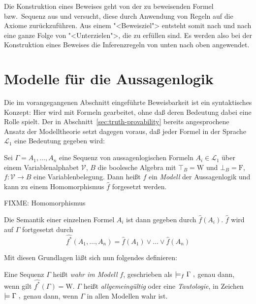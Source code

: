 Die Konstruktion eines Beweises geht
von der zu beweisenden Formel bzw.\ Sequenz aus und
versucht, diese durch Anwendung von Regeln auf die Axiome zurückzuführen.  Aus
einem "<Beweisziel"> entsteht somit nach und nach eine ganze Folge von
"<Unterzielen">, die zu erfüllen sind.  Es werden also bei der Konstruktion eines
Beweises die Inferenzregeln von unten nach
oben angewendet.

\section{Modelle für die Aussagenlogik}
\label{sec:models}

Die im vorangegangenen Abschnitt eingeführte Beweisbarkeit ist ein
syntaktisches Konzept: Hier wird mit Formeln gearbeitet, ohne daß deren
Bedeutung dabei eine Rolle spielt.  Der in
Abschnitt~\ref{sec:truth-provability} bereits angesprochene Ansatz der
Modelltheorie setzt dagegen voraus, daß jeder
Formel in der Sprache $\mathcal{L}_1$ eine Bedeutung gegeben wird:  

\begin{definition}
  Sei $\Gamma=A_1,\ldots,A_n$ eine Sequenz von aussagenlogischen Formeln $A_i\in
  \mathcal{L}_1$ über einem Variablenalphabet
  $\mathcal{V}$, $B$ die boolesche Algebra mit $\top_B=\mathrm{W}$ und $\bot_B=\mathrm{F}$, $f:\mathcal{V}\rightarrow 
  B$ eine Variablenbelegung.  Dann heißt $f$ ein \emph{Modell} der
  Aussagenlogik und kann zu einem
  Homomorphismus $\hat{f}$ forgesetzt werden.

  FIXME: Homomorphismus

  Die Semantik einer einzelnen Formel $A_i$ ist dann gegeben
  durch $\hat{f}(A_i)$.  $\hat{f}$ wird auf $\Gamma$
  fortgesetzt durch
  \[ \widehat{\mbox{$f$}^*}(A_1,\dots,A_n) = \hat{f}(A_1)\vee\dots\vee\hat{f}(A_n)\]
\end{definition}

Mit diesen Grundlagen läßt sich nun folgendes definieren:

\begin{definition}
  Eine Sequenz $\Gamma$ heißt \emph{wahr im Modell} $f$, geschrieben
  als
%
\(
  \models_f \Gamma\ ,\index{*@$\models_f$}
\)
genau dann, wenn gilt
\(\widehat{\mbox{$f$}^*}(\Gamma) = \mathrm{W}\).
%
$\Gamma$ heißt \emph{allgemeingültig} oder eine \emph{Tautologie}, in Zeichen
%
\(
  \models \Gamma\ ,\index{*@$\models$}
\)
%
genau dann, wenn $\Gamma$ in allen Modellen wahr ist.

\end{definition}

